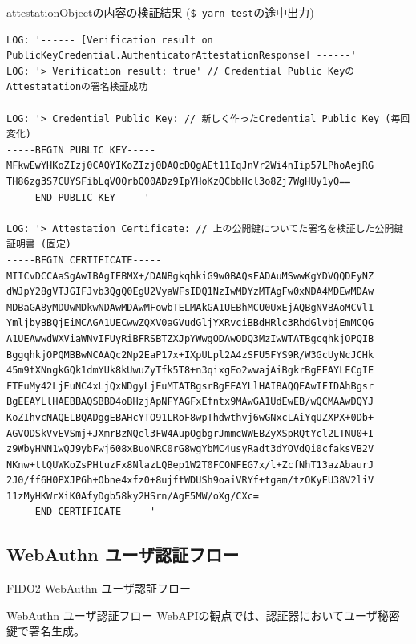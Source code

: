 \documentclass[12pt,dvipdfmx,uplatex]{beamer}
\begin{document}
\begin{frame}[fragile]
\begin{exampleblock}{\scriptsize attestationObjectの内容の検証結果 (\texttt{\$ yarn test}の途中出力)}
\tiny
 \begin{verbatim}
LOG: '------ [Verification result on PublicKeyCredential.AuthenticatorAttestationResponse] ------'
LOG: '> Verification result: true' // Credential Public KeyのAttestatationの署名検証成功

LOG: '> Credential Public Key: // 新しく作ったCredential Public Key (毎回変化)
-----BEGIN PUBLIC KEY-----
MFkwEwYHKoZIzj0CAQYIKoZIzj0DAQcDQgAEt11IqJnVr2Wi4nIip57LPhoAejRG
TH86zg3S7CUYSFibLqVOQrbQ00ADz9IpYHoKzQCbbHcl3o8Zj7WgHUy1yQ==
-----END PUBLIC KEY-----'

LOG: '> Attestation Certificate: // 上の公開鍵についてた署名を検証した公開鍵証明書 (固定)
-----BEGIN CERTIFICATE-----
MIICvDCCAaSgAwIBAgIEBMX+/DANBgkqhkiG9w0BAQsFADAuMSwwKgYDVQQDEyNZ
dWJpY28gVTJGIFJvb3QgQ0EgU2VyaWFsIDQ1NzIwMDYzMTAgFw0xNDA4MDEwMDAw
MDBaGA8yMDUwMDkwNDAwMDAwMFowbTELMAkGA1UEBhMCU0UxEjAQBgNVBAoMCVl1
YmljbyBBQjEiMCAGA1UECwwZQXV0aGVudGljYXRvciBBdHRlc3RhdGlvbjEmMCQG
A1UEAwwdWXViaWNvIFUyRiBFRSBTZXJpYWwgODAwODQ3MzIwWTATBgcqhkjOPQIB
BggqhkjOPQMBBwNCAAQc2Np2EaP17x+IXpULpl2A4zSFU5FYS9R/W3GcUyNcJCHk
45m9tXNngkGQk1dmYUk8kUwuZyTfk5T8+n3qixgEo2wwajAiBgkrBgEEAYLECgIE
FTEuMy42LjEuNC4xLjQxNDgyLjEuMTATBgsrBgEEAYLlHAIBAQQEAwIFIDAhBgsr
BgEEAYLlHAEBBAQSBBD4oBHzjApNFYAGFxEfntx9MAwGA1UdEwEB/wQCMAAwDQYJ
KoZIhvcNAQELBQADggEBAHcYTO91LRoF8wpThdwthvj6wGNxcLAiYqUZXPX+0Db+
AGVODSkVvEVSmj+JXmrBzNQel3FW4AupOgbgrJmmcWWEBZyXSpRQtYcl2LTNU0+I
z9WbyHNN1wQJ9ybFwj608xBuoNRC0rG8wgYbMC4usyRadt3dYOVdQi0cfaksVB2V
NKnw+ttQUWKoZsPHtuzFx8NlazLQBep1W2T0FCONFEG7x/l+ZcfNhT13azAbaurJ
2J0/ff6H0PXJP6h+Obne4xfz0+8ujftWDUSh9oaiVRYf+tgam/tzOKyEU38V2liV
11zMyHKWrXiK0AfyDgb58ky2HSrn/AgE5MW/oXg/CXc=
-----END CERTIFICATE-----'
 \end{verbatim}
\end{exampleblock}
\end{frame}


\subsection{WebAuthn ユーザ認証フロー}

\begin{frame}
\centering
{\Large FIDO2 WebAuthn ユーザ認証フロー}
\end{frame}

\begin{frame}{WebAuthn ユーザ認証フロー}
WebAPIの観点では、認証器においてユーザ秘密鍵で署名生成。
\end{frame}
\end{document}
